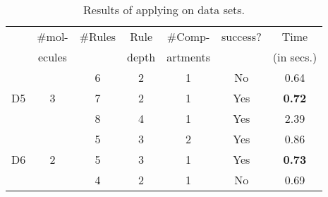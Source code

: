 \begin{table}[t]
\begin{minipage}{0.48\linewidth}
  \begin{tabular}[t]{|c|c|c|c|c|c|c|}\hline
     & \#mol- & \#Rules & Rule  & \#Comp- & success? & Time \\
         & ecules   &         & depth & artments &          & (in secs.) \\\hline
         
         
         
         
         &   & 6  & 2 & 1 & No &  0.64 \\\cline{3-7}
    D5   & 3 & 7  & 2 & 1 & Yes & {\bf 0.72}  \\\cline{3-7}
         &   & 8  & 4 & 1 & Yes  &  2.39 \\\hline
         
         &   & 5  & 3 & 2 & Yes &  0.86 \\\cline{3-7}
    D6   & 2 & 5  & 3 & 1 & Yes & {\bf 0.73}  \\\cline{3-7}
         &   & 4  & 2 & 1 & No  & 0.69  \\\hline
  \end{tabular}
    
  \end{minipage}
  \caption{Results of applying \ourtool on data sets.
  }
  \label{tab:results}
\end{table}
